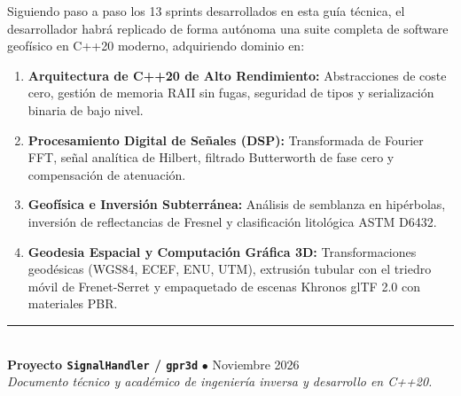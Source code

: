 \documentclass[11pt,a4paper]{article}
\begin{document}
Siguiendo paso a paso los 13 sprints desarrollados en esta guía técnica, el desarrollador habrá replicado de forma autónoma una suite completa de software geofísico en C++20 moderno, adquiriendo dominio en:
\begin{enumerate}
    \item \textbf{Arquitectura de C++20 de Alto Rendimiento:} Abstracciones de coste cero, gestión de memoria RAII sin fugas, seguridad de tipos y serialización binaria de bajo nivel.
    \item \textbf{Procesamiento Digital de Señales (DSP):} Transformada de Fourier FFT, señal analítica de Hilbert, filtrado Butterworth de fase cero y compensación de atenuación.
    \item \textbf{Geofísica e Inversión Subterránea:} Análisis de semblanza en hipérbolas, inversión de reflectancias de Fresnel y clasificación litológica ASTM D6432.
    \item \textbf{Geodesia Espacial y Computación Gráfica 3D:} Transformaciones geodésicas (WGS84, ECEF, ENU, UTM), extrusión tubular con el triedro móvil de Frenet-Serret y empaquetado de escenas Khronos glTF 2.0 con materiales PBR.
\end{enumerate}

\begin{center}
    \vspace{0.8cm}
    \rule{0.6\textwidth}{0.8pt}\\[0.2cm]
    \textbf{Proyecto \texttt{SignalHandler} / \texttt{gpr3d}} $\bullet$ Noviembre 2026\\
    \textit{Documento técnico y académico de ingeniería inversa y desarrollo en C++20.}
\end{center}
\end{document}
